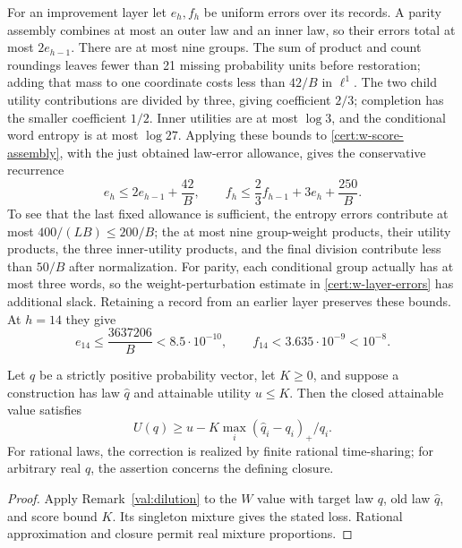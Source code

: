 For an improvement layer let $e_h,f_h$ be uniform errors over its records.
A parity assembly combines at most an outer law and an inner law, so
their errors total at most $2e_{h-1}$.  There are at most nine groups.
The sum of product and count roundings leaves fewer than 21 missing
probability units before restoration; adding that mass to one coordinate
costs less than $42/B$ in $\ell^1$.  The two child utility contributions
are divided by three, giving coefficient $2/3$; completion has the
smaller coefficient $1/2$.  Inner utilities are at most $\log3$, and
the conditional word entropy is at most $\log27$.  Applying these
bounds to \eqref{cert:w-score-assembly}, with the just obtained
law-error allowance, gives the conservative recurrence
\begin{equation}
 e_h\le2e_{h-1}+\frac{42}{B},\qquad
 f_h\le\frac23 f_{h-1}+3e_h+\frac{250}{B}.
 \label{cert:w-layer-errors}
\end{equation}
To see that the last fixed allowance is sufficient, the entropy errors
contribute at most $400/(LB)\le200/B$; the at most nine group-weight
products, their utility products, the three inner-utility products, and
the final division contribute less than $50/B$ after normalization.
For parity, each conditional group actually has at most three words, so
the weight-perturbation estimate in \eqref{cert:w-layer-errors} has
additional slack.  Retaining a record from an earlier layer preserves
these bounds.  At $h=14$ they give
\begin{equation}
 e_{14}\le\frac{3637206}{B}<8.5\cdot10^{-10},\qquad
 f_{14}<3.635\cdot10^{-9}<10^{-8}.
 \label{cert:w-library-errors}
\end{equation}

\begin{lemma}
\label{cert:w-correction}
Let $q$ be a strictly positive probability vector, let $K\ge0$, and
suppose a construction has law $\widehat q$ and attainable utility $u\le K$.
Then the closed attainable value satisfies
\[
 U(q)\ge u-K\max_i(\widehat q_i-q_i)_+/q_i.
\]
For rational laws, the correction is realized by finite rational time-sharing;
for arbitrary real $q$, the assertion concerns the defining closure.
\end{lemma}
\begin{proof}
Apply Remark~\ref{val:dilution} to the $W$ value with target law $q$,
old law $\widehat q$, and score bound $K$.  Its singleton mixture gives
the stated loss.  Rational approximation and closure permit real mixture
proportions.
\end{proof}

